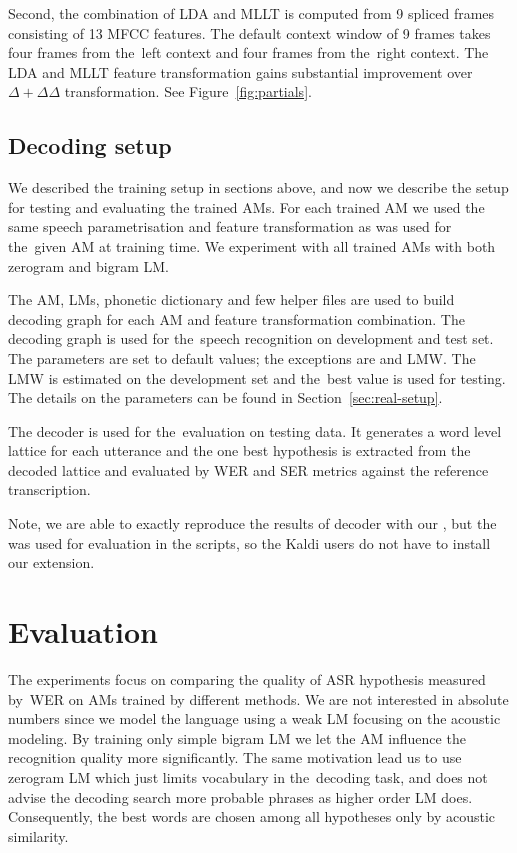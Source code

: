 Second, the combination of \ac{LDA} and \ac{MLLT} is computed from 9 spliced frames consisting of 13 \ac{MFCC} features. 
The default context window of 9 frames takes four frames from the~left context and four frames from the~right context.
The \ac{LDA} and \ac{MLLT} feature transformation gains substantial improvement over $\Delta+\Delta\Delta$ transformation.
See Figure~\ref{fig:partials}.

\subsection*{Decoding setup}
We described the training setup in sections above, and now we describe the setup for testing and evaluating the trained \acp{AM}.
For each trained \ac{AM} we used the same speech parametrisation and feature transformation as was used for the~given \ac{AM} at training time.
We experiment with all trained \acp{AM} with both zerogram and bigram \ac{LM}.

The \ac{AM}, \acp{LM}, phonetic dictionary and few helper files are used to build  decoding graph for each \ac{AM} and feature transformation combination.
The decoding graph is used for the~speech recognition on development and test set.
The parameters are set to default values; the exceptions are  and \acl{LMW}. 
The \ac{LMW} is estimated on the development set and the~best value is used for testing.
The details on the parameters can be found in Section~\ref{sec:real-setup}.

The  decoder is used for the~evaluation on testing data.
It generates a word level lattice for each utterance and the one best hypothesis is extracted from the decoded lattice and evaluated by \ac{WER} and \ac{SER} metrics against the reference transcription.

Note, we are able to exactly reproduce the results of  decoder with our , but the  was used for evaluation in the scripts, so the Kaldi users do not have to install our extension.

\section{Evaluation}
\label{sec:am_eval}

The experiments focus on comparing the quality of ASR hypothesis measured by~\ac{WER} on \acp{AM} trained by different methods.
We are not interested in absolute numbers since we model the language using a weak \ac{LM} focusing on the acoustic modeling.
By training only simple bigram \ac{LM} we let the \ac{AM} influence the recognition quality more significantly. 
The same motivation lead us to use zerogram \ac{LM} which just limits vocabulary in the~decoding task, and does not advise the decoding search more probable phrases as higher order \ac{LM} does.
Consequently, the best words are chosen among all hypotheses only by acoustic similarity.

